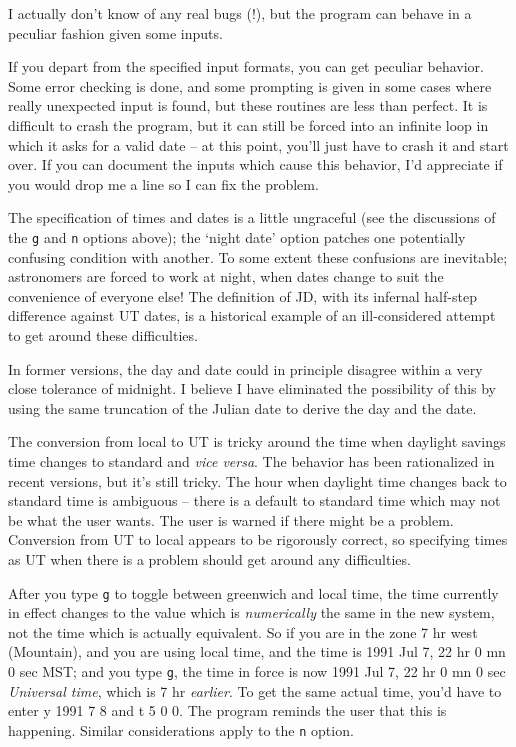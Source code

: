 I actually don't know of any real bugs (!), but the program
can behave in a peculiar fashion given some inputs.

If you depart from the specified input formats, you can get 
peculiar behavior.  Some error checking is done, and some prompting
is given in some cases where really unexpected input is found, but
these routines are less than perfect.  It is difficult
to crash the program, but it can still be forced into an 
infinite loop in which it asks for a valid date -- at this point,
you'll just have to crash it and start over.  If you can 
document the inputs which cause this behavior, I'd appreciate
if you would drop me a line so I can fix the problem.

The specification of times and dates is a little ungraceful (see the
discussions of the {\tt g} and {\tt n} options above); the
`night date' option patches one potentially confusing condition with another.
To some extent these confusions are inevitable; astronomers are forced to
work at night, when dates change to suit the convenience of
everyone else!  The definition of JD, with its infernal half-step
difference against UT dates, is a historical example of an ill-considered
attempt to get around these difficulties.  

In former versions, the day and date could in principle disagree 
within a very close tolerance of midnight.  I believe I have
eliminated the possibility of this by using the same truncation
of the Julian date to derive the day and the date.

The conversion from local to UT is tricky around
the time when daylight savings time changes to standard
and {\it vice versa}.  The behavior has been rationalized in 
recent versions, but it's still tricky.  The hour when 
daylight time changes back to standard time is ambiguous -- there
is a default to standard time which may not be what the user wants.  
The user is warned if
there might be a problem.  Conversion from UT to local appears
to be rigorously correct, so specifying times as UT when there
is a problem should get around any difficulties.

After you type {\tt g} to toggle between greenwich and local
time, the time currently in effect changes to the value
which is {\it numerically} the same in the new system, not the
time which is actually equivalent.  So if you are in the zone
7 hr west (Mountain), and you are using local time, and
the time is 1991 Jul 7, 22 hr 0 mn 0 sec MST; and you type {\tt g},
the time in force is now 1991 Jul 7, 22 hr 0 mn 0 sec {\it Universal time},
which is 7 hr {\it earlier}.  To get the same actual time, you'd have to
enter y 1991 7 8 and t 5 0 0.  The program reminds the user
that this is happening.  Similar considerations apply to the
{\tt n} option.

